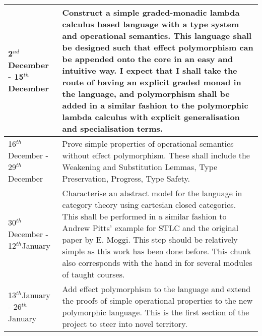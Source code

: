 \documentclass[11pt]{article}
\renewcommand{\th}{$^{th}$}
\newcommand{\nd}{$^{nd}$}
\begin{document}
\begin{tabular}{|p{6cm}||p{10cm}|}
\hline
	2\nd December - 15\th December & Construct a simple graded-monadic lambda calculus based language with a type system and operational semantics. This language shall be designed such that effect polymorphism can be appended onto the core in an easy and intuitive way. I expect that I shall take the route of having an explicit graded monad in the language, and polymorphism shall be added in a similar fashion to the polymorphic lambda calculus with explicit generalisation and specialisation terms.\\\hline
	16\th December - 29\th December & Prove simple properties of operational semantics without effect polymorphism. These shall include the Weakening and Substitution Lemmas, Type Preservation, Progress, Type Safety.\\\hline
	30\th December - 12\th January & Characterise an abstract model for the language in category theory using cartesian closed categories. This shall be performed in a similar fashion to Andrew Pitts' example for STLC and the original paper by E. Moggi. This step should be relatively simple as this work has been done before. This chunk also corresponds with the hand in for several modules of taught courses.  \\\hline
	13\th January - 26\th January &  Add effect polymorphism to the language and extend the proofs of simple operational properties to the new polymorphic language. This is the first section of the project to steer into novel territory. \\\hline
	

\end{tabular}
\end{document}
